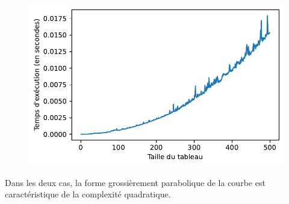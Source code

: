 \documentclass[
  a4paper,
  DIV=11,
  numbers=noendperiod]{scrartcl}
\begin{document}
\begin{figure}[H]

{\centering \includegraphics{tris_files/figure-pdf/cell-7-output-1.pdf}

}

\end{figure}

Dans les deux cas, la forme grossièrement parabolique de la courbe est
caractéristique de la complexité quadratique.
\end{document}
